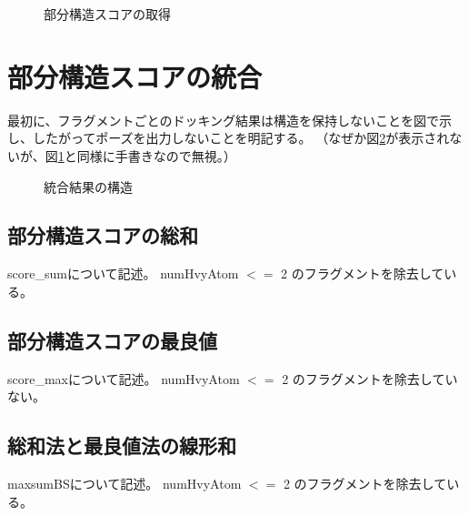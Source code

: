 \begin{figure}[htp]
 \begin{center}
  \caption{部分構造スコアの取得}
  \label{fig:fragment_result}
 \end{center}
\end{figure}

\section{部分構造スコアの統合}
最初に、フラグメントごとのドッキング結果は構造を保持しないことを図で示し、したがってポーズを出力しないことを明記する。
（なぜか図\ref{fig:fragment_docking_result}が表示されないが、図\ref{fig:fragment_result}と同様に手書きなので無視。）
\begin{figure}[htp]
 \begin{center}
  \caption{統合結果の構造}
  \label{fig:fragment_docking_result}
 \end{center}
\end{figure}


\subsection{部分構造スコアの総和}
score\_sumについて記述。
numHvyAtom $<=$ 2 のフラグメントを除去している。
\subsection{部分構造スコアの最良値}
score\_maxについて記述。
numHvyAtom $<=$ 2 のフラグメントを除去していない。
\subsection{総和法と最良値法の線形和}
maxsumBSについて記述。
numHvyAtom $<=$ 2 のフラグメントを除去している。
